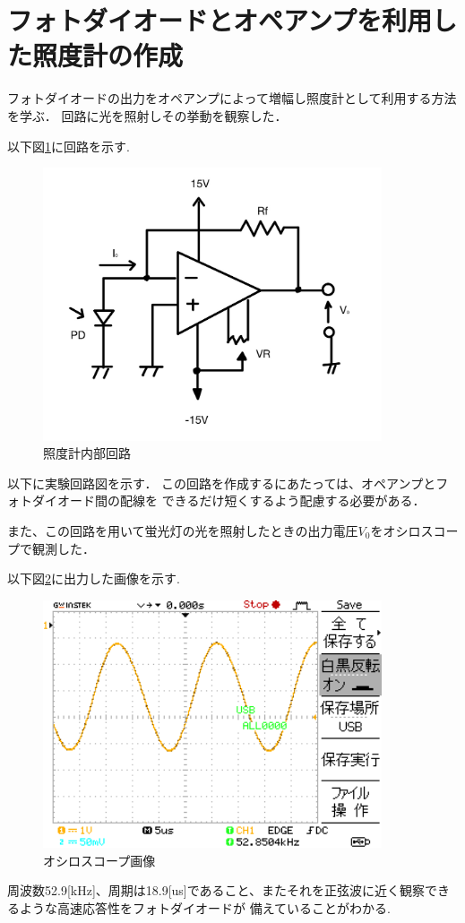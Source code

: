 \documentclass[titlepage]{jarticle}
\begin{document}
\section{フォトダイオードとオペアンプを利用した照度計の作成}
フォトダイオードの出力をオペアンプによって増幅し照度計として利用する方法を学ぶ．
回路に光を照射しその挙動を観察した．

以下図\ref{fig:照度系内部回路}に回路を示す.
\begin{figure}[H]
    \begin{center}
        \includegraphics[width=10cm]{image/6.jpg}
        \caption{照度計内部回路}
        \label{fig:照度系内部回路}
    \end{center}
\end{figure}

以下に実験回路図を示す．
この回路を作成するにあたっては、オペアンプとフォトダイオード間の配線を
できるだけ短くするよう配慮する必要がある．

また、この回路を用いて蛍光灯の光を照射したときの出力電圧$V_0$をオシロスコープで観測した．

以下図\ref{オシロスコープ画像}に出力した画像を示す.
\begin{figure}[H]
    \begin{center}
        \includegraphics[width=10cm]{image/A0000DS.BMP}
        \caption{オシロスコープ画像}
        \label{オシロスコープ画像}
    \end{center}
\end{figure}
周波数52.9[kHz]、周期は18.9[us]であること、またそれを正弦波に近く観察できるような高速応答性をフォトダイオードが
備えていることがわかる.
\end{document}
